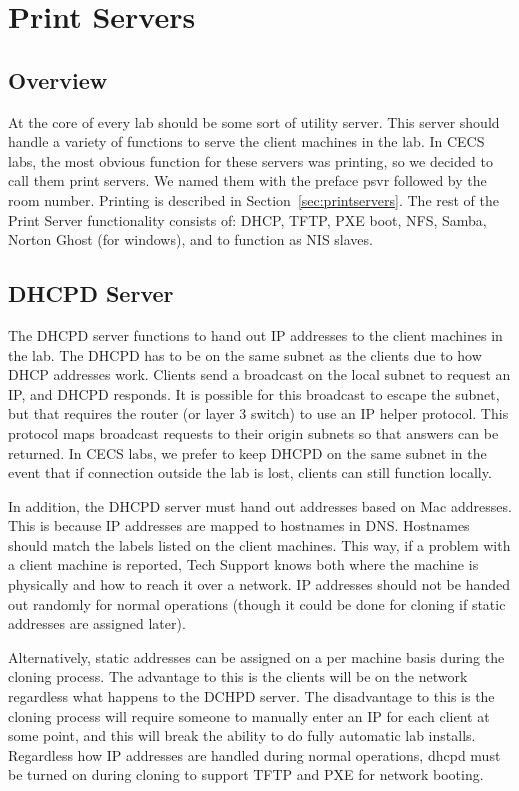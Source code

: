 \section{Print Servers} \label{sec:Print Servers}
\subsection{Overview}
At the core of every lab should be some sort of utility server.  This server should handle a variety of functions to serve the client machines in the lab.  In CECS labs, the most obvious function for these servers was printing, so we decided to call them print servers. We named them with the preface psvr followed by the room number.  Printing is described in Section~\ref{sec:printservers}.  The rest of the Print Server functionality consists of:  DHCP, TFTP, PXE boot, NFS, Samba, Norton Ghost (for windows), and to function as NIS slaves.
\subsection{DHCPD Server}
The DHCPD server functions to hand out IP addresses to the client machines in the lab.  The DHCPD has to be on the same subnet as the clients due to how DHCP addresses work.  Clients send a broadcast on the local subnet to request an IP, and DHCPD responds.  It is possible for this broadcast to escape the subnet, but that requires the router (or layer 3 switch) to use an IP helper protocol.  This protocol maps broadcast requests to their origin subnets so that answers can be returned.  In CECS labs, we prefer to keep DHCPD on the same subnet in the event that if connection outside the lab is lost, clients can still function locally.  

In addition, the DHCPD server must hand out addresses based on Mac addresses.  This is because IP addresses are mapped to hostnames in DNS.  Hostnames should match the labels listed on the client machines.  This way, if a problem with a client machine is reported, Tech Support knows both where the machine is physically and how to reach it over a network.  IP addresses should not be handed out randomly for normal operations (though it could be done for cloning if static addresses are assigned later).  

Alternatively, static addresses can be assigned on a per machine basis during the cloning process.  The advantage to this is the clients will be on the network regardless what happens to the DCHPD server.  The disadvantage to this is the cloning process will require someone to manually enter an IP for each client at some point, and this will break the ability to do fully automatic lab installs.   Regardless how IP addresses are handled during normal operations, dhcpd must be turned on during cloning to support TFTP and PXE for network booting.  
